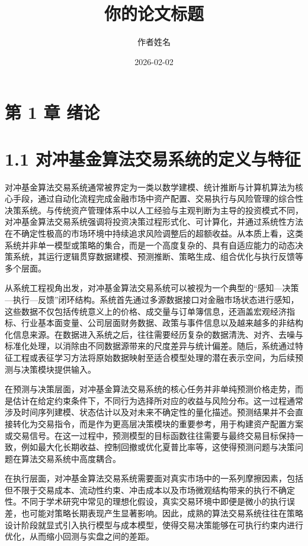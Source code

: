 \documentclass[UTF8]{ctexart}
\title{你的论文标题}
\author{作者姓名}
\date{2026-02-02}
\begin{document}
\maketitle

\section{第 1 章 绪论}\label{ux7b2c-1-ux7ae0-ux7eeaux8bba}

\section{1.1
对冲基金算法交易系统的定义与特征}\label{ux5bf9ux51b2ux57faux91d1ux7b97ux6cd5ux4ea4ux6613ux7cfbux7edfux7684ux5b9aux4e49ux4e0eux7279ux5f81}

对冲基金算法交易系统通常被界定为一类以数学建模、统计推断与计算机算法为核心手段，通过自动化流程完成金融市场中资产配置、交易执行与风险管理的综合性决策系统。与传统资产管理体系中以人工经验与主观判断为主导的投资模式不同，对冲基金算法交易系统强调将投资决策过程形式化、可计算化，并通过系统性方法在不确定性极高的市场环境中持续追求风险调整后的超额收益。从本质上看，这类系统并非单一模型或策略的集合，而是一个高度复杂的、具有自适应能力的动态决策系统，其运行逻辑贯穿数据建模、预测推断、策略生成、组合优化与执行反馈等多个层面。

从系统工程视角出发，对冲基金算法交易系统可以被视为一个典型的``感知---决策---执行---反馈''闭环结构。系统首先通过多源数据接口对金融市场状态进行感知，这些数据不仅包括传统意义上的价格、成交量与订单簿信息，还涵盖宏观经济指标、行业基本面变量、公司层面财务数据、政策与事件信息以及越来越多的非结构化信息来源。在数据进入系统之后，往往需要经历复杂的数据清洗、对齐、去噪与标准化处理，以消除由不同数据源带来的尺度差异与统计偏差。随后，系统通过特征工程或表征学习方法将原始数据映射至适合模型处理的潜在表示空间，为后续预测与决策模块提供输入。

在预测与决策层面，对冲基金算法交易系统的核心任务并非单纯预测价格走势，而是估计在给定约束条件下，不同行为选择所对应的收益与风险分布。这一过程通常涉及时间序列建模、状态估计以及对未来不确定性的量化描述。预测结果并不会直接转化为交易指令，而是作为更高层决策模块的重要参考，用于构建资产配置方案或交易信号。在这一过程中，预测模型的目标函数往往需要与最终交易目标保持一致，例如最大化长期收益、控制回撤或优化夏普比率等，这使得预测问题与决策问题在算法交易系统中高度耦合。

在执行层面，对冲基金算法交易系统需要面对真实市场中的一系列摩擦因素，包括但不限于交易成本、流动性约束、冲击成本以及市场微观结构带来的执行不确定性。不同于学术研究中常见的理想化假设，真实交易环境中即便是微小的执行误差，也可能对策略长期表现产生显著影响。因此，成熟的算法交易系统往往在策略设计阶段就显式引入执行模型与成本模型，使得交易决策能够在可执行约束内进行优化，从而缩小回测与实盘之间的差距。
\end{document}
